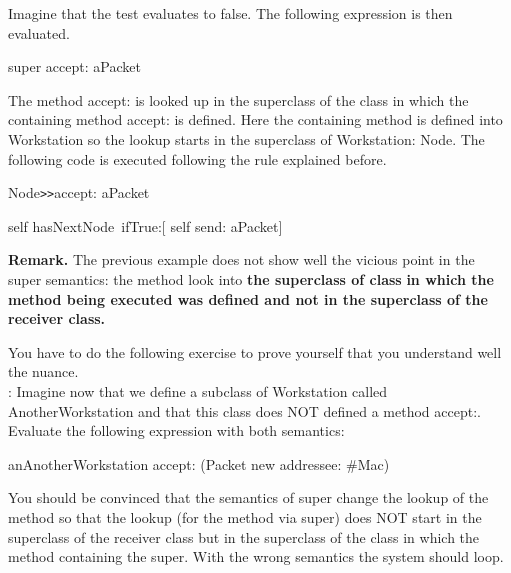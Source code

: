 Imagine that the test evaluates to false. The following expression 
is then evaluated.

\begin{code}
 super accept: aPacket
 \end{code}


The method accept: is looked up in the superclass of the class 
in which the containing method accept: is defined. Here the containing 
method is defined into Workstation so the lookup starts in the 
superclass of Workstation: Node. The following code is executed 
following the rule explained before. 

\begin{code}
Node\texttt{>>}accept: aPacket

     self hasNextNode\
         ifTrue:\ensuremath{[} self send: aPacket\ensuremath{]}
\end{code}

\textbf{Remark.} The previous example does not show well the vicious 
point in the super semantics: the method look into \textbf{the superclass 
of class} \textbf{in which the method being executed was defined and 
not in the superclass of the receiver class.}

You have to do the following exercise to prove yourself that 
you understand well the nuance.\\
: Imagine now that we define a subclass of Workstation 
called AnotherWorkstation and that this class does NOT defined 
a method accept:. Evaluate the following expression with both 
semantics:

\begin{code}
 anAnotherWorkstation accept: (Packet new addressee: \#Mac)
\end{code}

You should be convinced that the semantics of super change the 
lookup of the method so that the lookup (for the method via super) 
does NOT start in the superclass of the receiver class but in 
the superclass of the class in which the method containing the 
super. With the wrong semantics the system should loop.








\endinput